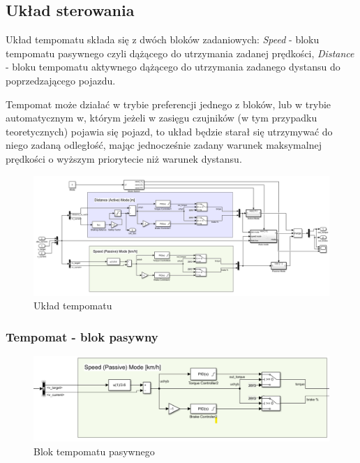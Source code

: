 \documentclass[12pt, a4paper, headings=normal]{article}
\begin{document}
\subsection{Układ sterowania}

Układ tempomatu składa się z dwóch bloków zadaniowych: \textit{Speed} - bloku tempomatu
pasywnego czyli dążącego do utrzymania zadanej prędkości, \textit{Distance} - bloku tempomatu
aktywnego dążącego do utrzymania zadanego dystansu do poprzedzającego pojazdu.

Tempomat może działać w trybie preferencji jednego z bloków, lub w trybie automatycznym
w, którym jeżeli w zasięgu czujników (w tym przypadku teoretycznych) pojawia się pojazd,
to układ będzie starał się utrzymywać do niego zadaną odległość, mając jednocześnie
zadany warunek maksymalnej prędkości o wyższym priorytecie niż warunek dystansu.
 

\newpage
\begin{landscape}
	\begin{figure}
		\centering
		\includegraphics[width=\linewidth]{tempomat.png}
		\caption{Układ tempomatu}
		\label{fig:tempomat}
	\end{figure}	
\end{landscape}


\subsubsection{Tempomat - blok pasywny}

\begin{figure}[H]
	\centering
	\includegraphics[width=\textwidth]{tempo_pass.png}
	\caption{Blok tempomatu pasywnego}
	\label{fig:tempo_pass}
\end{figure}
\end{document}
